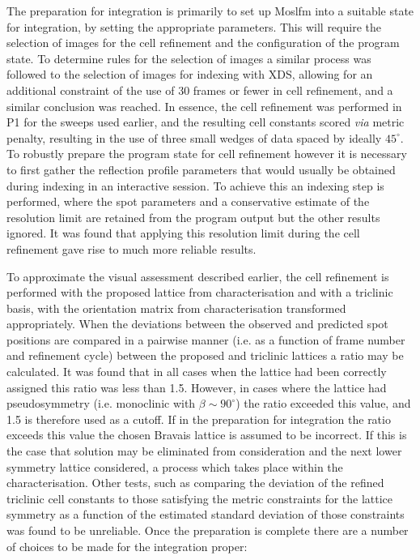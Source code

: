 \documentclass[preprint,pdf]{iucr}
\begin{document}
The preparation for integration is primarily to set up Moslfm into
a suitable state for integration, by setting the appropriate
parameters. This will require the
selection of images for the cell refinement and
the configuration of the program state. To determine rules for the
selection of images a similar process was followed to the selection of
images for indexing with XDS, allowing for an additional constraint of
the use of 30 frames or fewer in cell refinement, and a similar
conclusion was reached. 
In essence, the cell refinement was performed in P1 for the
sweeps used earlier, and the resulting cell constants scored
\emph{via} metric penalty, resulting in the use of three small wedges
of data spaced by ideally $45^{\circ}$. To robustly prepare the program state
for cell refinement however it is necessary to first gather the
reflection profile parameters that would usually be obtained during
indexing in an interactive session. To achieve this an indexing step is
performed, where the spot parameters and a conservative
estimate of the resolution limit are retained from the program output
but the other results ignored. It was found that
applying this resolution limit during the cell refinement gave rise to
much more reliable results.

To approximate the visual assessment described earlier, the cell
refinement is performed with the proposed lattice from
characterisation and with a triclinic 
basis, with the orientation matrix from
characterisation transformed appropriately. When the deviations
between the observed and predicted spot positions are compared in a
pairwise manner (i.e. as a function of frame number and refinement
cycle) between the proposed and triclinic lattices
a ratio may be calculated. It was found that in
all cases when the lattice had been correctly assigned this ratio was
less than 1.5. However, in cases where the lattice had pseudosymmetry
(i.e. monoclinic with $\beta \sim 90^{\circ}$)
the ratio exceeded this value, and 1.5 is therefore used as a
cutoff. If in the preparation for integration
the ratio exceeds this value the chosen Bravais lattice
is assumed to be incorrect. If this is the case that solution may be
eliminated from consideration and the next lower symmetry lattice
considered, a process which takes place within the characterisation.
Other tests, such as comparing the deviation of the refined triclinic
cell constants to those satisfying the metric constraints for the 
lattice symmetry as a function
of the estimated standard deviation of those constraints was found to
be unreliable. Once the preparation is complete there are a number of
choices to be made for the integration proper:
\end{document}
